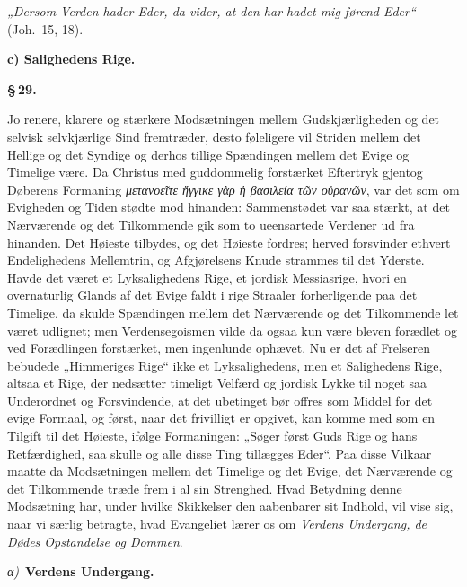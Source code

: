 \documentclass[12pt]{book}
\newcommand{\parmark}[1]{\begin{center}{\bfseries \S\,#1.}\end{center}}
\newcommand{\runhead}[1]{%
  \medskip\begin{center}{\bfseries #1}\end{center}\medskip}
\newcommand{\greekrun}[2]{%
  \medskip\begin{center}{\itshape #1)}\ {\bfseries #2}\end{center}\medskip}
\begin{document}
\emph{„Dersom Verden hader Eder, da vider, at den har hadet mig
førend Eder“} (Joh.\ 15, 18).

\runhead{c) Salighedens Rige.}
\parmark{29}

Jo renere, klarere og stærkere Modsætningen mellem Gudskjærligheden
og det selvisk selvkjærlige Sind fremtræder, desto føleligere vil
Striden mellem det Hellige og det Syndige og derhos tillige
Spændingen mellem det Evige og Timelige være. Da Christus med
guddommelig forstærket Eftertryk gjentog Døberens Formaning
\textit{μετανοεῖτε ἤγγικε γὰρ ἡ βασιλεία τῶν οὐρανῶν}, var det som om
Evigheden og Tiden stødte mod hinanden: Sammenstødet var saa stærkt,
at det Nærværende og det Tilkommende gik som to ueensartede Verdener
ud fra hinanden. Det Høieste tilbydes, og det Høieste fordres;
herved forsvinder ethvert Endelighedens Mellemtrin, og Afgjørelsens
Knude strammes til det Yderste. Havde det været et Lyksalighedens
Rige, et jordisk Messiasrige, hvori en overnaturlig Glands af det
Evige faldt i rige Straaler forherligende paa det Timelige, da
skulde Spændingen mellem det Nærværende og det Tilkommende let været
udlignet; men Verdensegoismen vilde da ogsaa kun være bleven
forædlet og ved Forædlingen forstærket, men ingenlunde ophævet. Nu
er det af Frelseren bebudede „Himmeriges Rige“ ikke et
Lyksalighedens, men et Salighedens Rige, altsaa et Rige, der
nedsætter timeligt Velfærd og jordisk Lykke til noget saa
Underordnet og Forsvindende, at det ubetinget bør offres som Middel
for det evige Formaal, og først, naar det frivilligt er opgivet, kan
komme med som en Tilgift til det Høieste, ifølge Formaningen: „Søger
først Guds Rige og hans Retfærdighed, saa skulle og alle disse Ting
tillægges Eder“. Paa disse Vilkaar maatte da Modsætningen mellem det
Timelige og det Evige, det Nærværende og det Tilkommende træde frem
i al sin Strenghed. Hvad Betydning denne Modsætning har, under
hvilke Skikkelser den aabenbarer sit Indhold, vil vise sig, naar vi
særlig betragte, hvad Evangeliet lærer os om \emph{Verdens
Undergang, de Dødes Opstandelse og Dommen}.

\greekrun{α}{Verdens Undergang.}
\end{document}
